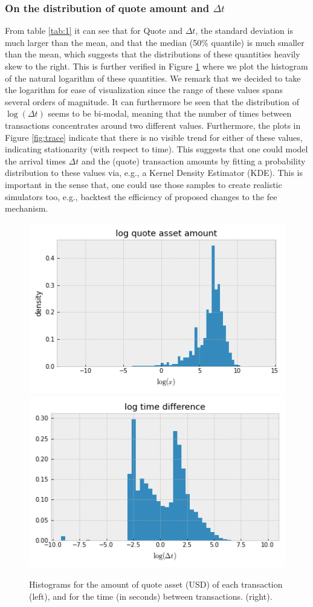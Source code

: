 \documentclass[]{scrartcl}
\begin{document}
	
	
	
	\subsubsection*{On the distribution of quote amount and $\Delta t$} From table \ref{tab:1} it can see that for Quote and $\Delta t$, the standard deviation is much larger than the mean, and that the median (50\% quantile) is much smaller than the mean, which suggests that the distributions of these quantities heavily skew to the right. This is further verified in Figure \ref{fig:densdt} where we plot the histogram of the natural logarithm of these quantities. We remark that we decided to take the logarithm for ease of visualization since the range of these values spans several orders of magnitude. It can furthermore be seen that the distribution of $\log(\Delta t)$ seems to be bi-modal, meaning that the number of times between transactions concentrates around two different values. Furthermore, the plots in Figure \ref{fig:trace}  indicate that there is no visible trend for either of these values, indicating stationarity (with respect to time). This suggests that one could model the arrival times $\Delta t$ and the (quote) transaction amounts by fitting a probability distribution to these values via, e.g., a Kernel Density Estimator (KDE). This is important in the sense that, one could use those samples to create realistic simulators too, e.g., backtest the efficiency of proposed changes to the fee mechanism. 
	
	\begin{figure}
		\centering
		\includegraphics[width=0.47\linewidth]{figures/dens_quote}
		\includegraphics[width=0.47\linewidth]{figures/dens_dt}
		\caption{Histograms for the amount of quote asset (USD) of each transaction (left), and for the time (in seconds) between transactions. (right). }
		\label{fig:densdt}
	\end{figure}
	
\end{document}
